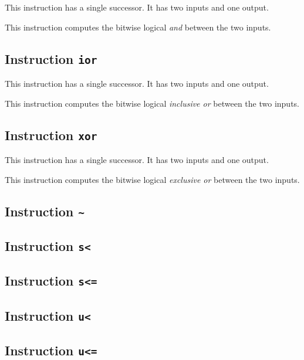 This instruction has a single successor.  It has two inputs and one
output. 

This instruction computes the bitwise logical \emph{and} between the
two inputs. 

\subsection{Instruction \texttt{ior}}
\label{mir-instruction-ior}

This instruction has a single successor.  It has two inputs and one
output. 

This instruction computes the bitwise logical \emph{inclusive or}
between the two inputs.

\subsection{Instruction \texttt{xor}}
\label{mir-instruction-xor}

This instruction has a single successor.  It has two inputs and one
output. 

This instruction computes the bitwise logical \emph{exclusive or}
between the two inputs.

\subsection{Instruction \texttt{\~}}
\label{mir-instruction-not}

\subsection{Instruction \texttt{s<}}
\label{mir-instruction-s-less}

\subsection{Instruction \texttt{s<=}}
\label{mir-instruction-s-less-or-equal}

\subsection{Instruction \texttt{u<}}
\label{mir-instruction-u-less}

\subsection{Instruction \texttt{u<=}}
\label{mir-instruction-u-less-or-equal}

